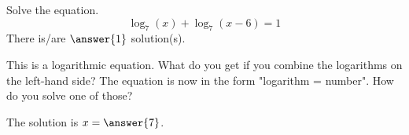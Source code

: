 \documentclass{ximera}
\author{Bobby Ramsey}
\begin{document}
\begin{exercise}
	Solve the equation.
	\[ \log_7(x) + \log_7(x-6) = 1 \]
	There is/are $\answer{1}$ solution(s).
	\begin{hint}
		This is a logarithmic equation.  What do you get if you combine the logarithms on the left-hand side?  The equation is now in the form "logarithm = number".  How do you solve one of those?
	\end{hint}
	\begin{exercise}
		The solution is $x = \answer{7}$.
	\end{exercise}
\end{exercise}
\end{document}
